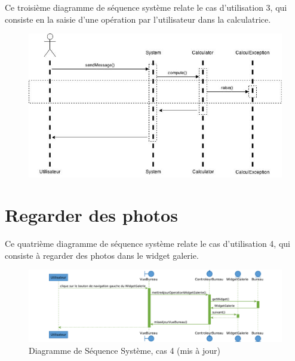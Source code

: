 \section{\color{red}{Saisir une opération (supprimé)}}

\color{red}{}Ce troisième diagramme de séquence système relate le cas d'utilisation
3, qui consiste en la saisie d'une opération par l'utilisateur dans la 
calculatrice.\color{black}

\begin{figure}[h!]
	\centering
	\includegraphics[scale=0.5]{diagrammes/DSS3.jpg}
	\caption{\color{red}{Diagramme de Séquence Système, cas 3 (supprimé)}}
\end{figure}

\section{Regarder des photos}

Ce quatrième diagramme de séquence système relate le cas d'utilisation
4, qui consiste à regarder des photos dans le widget galerie.

\begin{figure}[h!]
	\centering
	\includegraphics[angle=90, scale = 0.9]{diagrammes/dss4.pdf}
	\caption{\color{ForestGreen}Diagramme de Séquence Système, cas 4 (mis à jour)\color{black}}
\end{figure}
\newpage

